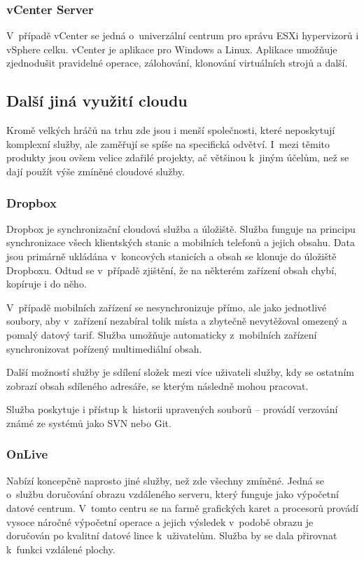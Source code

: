 \subsubsection{vCenter Server}
V~případě vCenter se jedná o~univerzální centrum pro správu ESXi hypervizorů i vSphere celku. vCenter je aplikace pro Windows a Linux. Aplikace umožňuje zjednodušit pravidelné operace, zálohování, klonování virtuálních strojů a další. 

\subsection{Další jiná využití cloudu}
Kromě velkých hráčů na trhu zde jsou i menší společnosti, které neposkytují komplexní služby, ale zaměřují se spíše na specifická odvětví. I~mezi těmito produkty jsou ovšem velice zdařilé projekty, ač většinou k~jiným účelům, než se dají použít výše zmíněné cloudové služby.

\subsubsection{Dropbox}
Dropbox je synchronizační cloudová služba a úložiště. Služba funguje na principu synchronizace všech klientských stanic a mobilních telefonů a jejich obsahu. Data jsou primárně ukládána v~koncových stanicích a obsah se klonuje do úložiště Dropboxu. Odtud se v~případě zjištění, že na některém zařízení obsah chybí, kopíruje i do něho. 

V~případě mobilních zařízení se nesynchronizuje přímo, ale jako jednotlivé soubory, aby v~zařízení nezabíral tolik místa a zbytečně nevytěžoval omezený a pomalý datový tarif. Služba umožňuje automaticky z~mobilních zařízení synchronizovat pořízený multimediální obsah.

Další možností služby je sdílení složek mezi více uživateli služby, kdy se ostatním zobrazí obsah sdíleného adresáře, se kterým následně mohou pracovat.

Služba poskytuje i přístup k~historii upravených souborů -- provádí verzování známé ze systémů jako SVN nebo Git.

\subsubsection{OnLive}
\label{sec:onlive}
Nabízí koncepčně naprosto jiné služby, než zde všechny zmíněné. Jedná se o~službu doručování obrazu vzdáleného serveru, který funguje jako výpočetní datové centrum. V~tomto centru se na farmě grafických karet a procesorů provádí vysoce náročné výpočetní operace a jejich výsledek v~podobě obrazu je doručován po kvalitní datové lince k~uživatelům. Služba by se dala přirovnat k~funkci vzdálené plochy.

